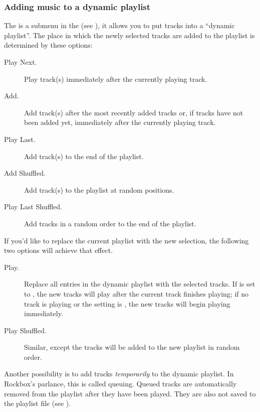 \subsubsection{\label{ref:playingnext_submenu}Adding music to a dynamic playlist}
The  is a submenu in the  (see
), it allows you to put tracks into a
``dynamic playlist''. The place in which the newly
selected tracks are added to the playlist is determined by these
options:

\begin{description}
\item [Play Next.] Play track(s) immediately after the currently playing track.

\item [Add.] Add track(s) after the most recently added tracks or, if tracks
have not been added yet, immediately after the currently playing track.

\item [Play Last.] Add track(s) to the end of the playlist.

\item [Add Shuffled.] Add track(s) to the playlist at random positions.

\item [Play Last Shuffled.] Add tracks in a random order to the end of the playlist.
\end{description}

If you'd like to replace the current playlist with the new selection, the
following two options will achieve that effect.

\begin{description}
\item [Play.] Replace all entries in the dynamic playlist with the selected
  tracks. If  is set to
  , the new tracks will play after the current track finishes
  playing; if no track is playing or the setting is , the new
  tracks will begin playing immediately.

\item [Play Shuffled.] Similar, except the tracks will be added to the new
  playlist in random order.
\end{description}

Another possibility is to add tracks \emph{temporarily} to the dynamic playlist.
In Rockbox’s parlance, this is called queuing. Queued tracks are automatically
removed from the playlist after they have been played. They are also not saved
to the playlist file (see ).

